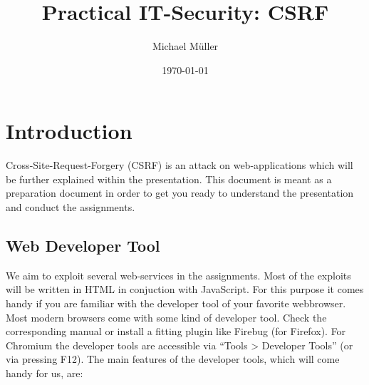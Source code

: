 \documentclass{report}
\title{Practical IT-Security: CSRF}
\author{Michael Müller}
\date{\today}
\begin{document}
\newpage

\maketitle

\newpage


\section{Introduction}

Cross-Site-Request-Forgery (\textsc{CSRF}) is an attack on web-applications
which will be further explained within the presentation.
This document is meant as a preparation document in order to get you ready to
understand the presentation and conduct the assignments.

\subsection{Web Developer Tool}

We aim to exploit several web-services in the assignments. Most of the 
exploits will be written in HTML in conjuction with JavaScript. For this 
purpose it comes handy if you are familiar with the developer tool of your 
favorite webbrowser.
Most modern browsers come with some kind of developer tool. Check the
corresponding manual or install a fitting plugin like Firebug (for Firefox). 
For Chromium the developer tools are accessible via ``Tools > Developer 
Tools'' (or via pressing F12).
The main features of the developer tools, which will come handy for us, are: 
\end{document}
